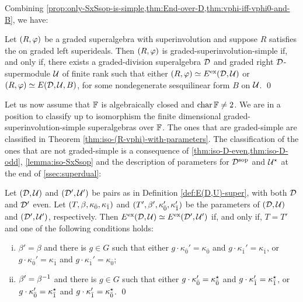 Combining \cref{prop:only-SxSsop-is-simple,thm:End-over-D,thm:vphi-iff-vphi0-and-B}, we have:

\begin{cor}\label{cor:SxSsop-with-dcc}
    Let $(R, \varphi)$ be a graded superalgebra with superinvolution and suppose $R$ satisfies the \dcc on graded left superideals. 
    Then $(R, \varphi)$ is graded-superinvolution-simple if, and only if, there exists a graded-division superalgebra $\mathcal{D}$ and graded right $\mathcal{D}$-supermodule $\mathcal U$ of finite rank such that either
    $(R, \varphi) \simeq E^{\mathrm{ex}} (\mathcal{D}, \mathcal U)$ or $(R, \varphi) \simeq E(\mathcal{D}, \mathcal U, B)$, for some nondegenerate sesquilinear form $B$ on $\mathcal U$. \qed
\end{cor}

Let us now assume that $\mathbb{F}$ is algebraically closed and $\operatorname{char} \mathbb{F} \neq 2$. 
We are in a position to classify up to isomorphism the finite dimensional graded-superinvolution-simple  superalgebras over $\mathbb{F}$. 
The ones that are graded-simple are classified in Theorem \ref{thm:iso-(R-vphi)-with-parameters}. 
The classification of the ones that are not graded-simple is a consequence of \cref{thm:iso-D-even,thm:iso-D-odd}, \cref{lemma:iso-SxSsop} and the description of parameters for $\mathcal{D}^{\mathrm{sop}}$ and $\mathcal U^\star$ at the end of \cref{ssec:superdual}:

\begin{thm}\label{thm:iso-D-even-ExEsop}
	Let $(\mathcal{D}, \mathcal U)$ and $(\mathcal{D}', \mathcal U')$ be pairs as in Definition \ref{def:E(D,U)-super}, with both $\mathcal{D}$ and $\mathcal{D}'$ even. 
	Let $(T, \beta, \kappa_{\bar{0}}, \kappa_{\bar{1}})$ and $(T', \beta', \kappa_{\bar{0}}', \kappa_{\bar{1}}')$ be the parameters of $(\mathcal{D}, \mathcal U)$ and $(\mathcal{D}', \mathcal U')$, respectively. 
	Then $E^{\mathrm{ex}}(\mathcal{D}, \mathcal U) \simeq E^{\mathrm{ex}}(\mathcal{D}', \mathcal U')$ if, and only if, $T=T'$ and one of the following conditions holds:
	\begin{enumerate}[(i)]
	    \item $\beta'=\beta$ and there is $g\in G$ such that either $g \cdot \kappa_{\bar 0}'=\kappa_{\bar 0}$ and $g \cdot \kappa_{\bar 1}'=\kappa_{\bar 1}$, or $g \cdot \kappa_{\bar 0}'=\kappa_{\bar 1}$ and $g \cdot \kappa_{\bar 1}'=\kappa_{\bar 0}$;
	    \item $\beta'=\beta^{-1}$ and there is $g\in G$ such that either $g \cdot \kappa_{\bar 0}'=\kappa_{\bar 0}^\star$ and $g \cdot \kappa_{\bar 1}'=\kappa_{\bar 1}^\star$, or $g \cdot \kappa_{\bar 0}'=\kappa_{\bar 1}^\star$ and $g \cdot \kappa_{\bar 1}'=\kappa_{\bar 0}^\star$. \qed
	\end{enumerate}
\end{thm}

